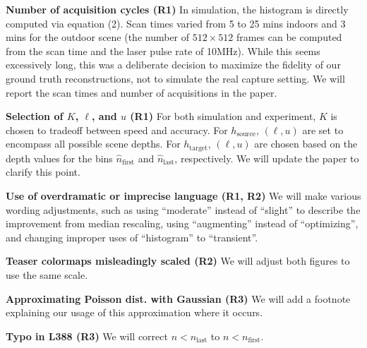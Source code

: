 \documentclass[10pt,twocolumn,letterpaper]{article}
\begin{document}
\vspace{1mm}\noindent\textbf{Number of acquisition cycles (R1)} In simulation, the histogram
is directly computed via equation (2).
Scan times varied from 5 to 25 mins indoors and 3 mins for the outdoor
scene (the number of $512 \times 512$
frames can be computed from the scan time and the laser pulse rate of 10MHz).
While this seems excessively long, this was a deliberate decision to maximize the fidelity of our
ground truth reconstructions, not to simulate the real capture setting. We
will report the scan times and number of acquisitions in the paper.

\vspace{1mm}\noindent\textbf{Selection of $K$, $\ell$, and $u$ (R1)} For both simulation and
experiment, $K$ is chosen to tradeoff between speed and accuracy. For
$h_{\text{source}}$, $(\ell, u)$ are set to encompass all possible scene depths. For 
    $h_{\text{target}}$, $(\ell, u)$ are chosen based on the depth values for
    the bins $\hat n_{\text{first}}$ and $\hat n_{\text{last}}$, respectively.
    We will update the paper to clarify this point.

\vspace{1mm}\noindent\textbf{Use of overdramatic or imprecise language (R1, R2)} We will make various
wording adjustments, such as using ``moderate'' instead of
``slight'' to describe the improvement from median rescaling, using
``augmenting'' instead of ``optimizing'', and changing improper uses of
``histogram'' to ``transient''.

\vspace{1mm}\noindent\textbf{Teaser colormaps misleadingly scaled (R2)} We will adjust both
    figures to use the same scale.

\vspace{1mm}\noindent\textbf{Approximating Poisson dist. with Gaussian (R3)} We will add a
    footnote explaining our usage of this approximation where it occurs.

\vspace{1mm}\noindent\textbf{Typo in L388 (R3)} We will correct $n < n_{\text{last}}$ to $n <
    n_{\text{first}}$.

{\small


}
\end{document}
